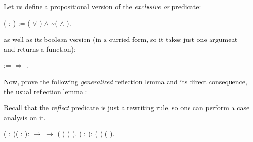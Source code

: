 \begin{exercise}


Let us define a propositional version of the \textit{exclusive or}
 predicate:


\begin{coqdoccode}
\coqdocemptyline
\coqdocnoindent
{}  ( : ) := ( \ensuremath{\lor} ) \ensuremath{\land} \~{}( \ensuremath{\land} ).\coqdoceol
\coqdocemptyline
\end{coqdoccode}


\noindent
as well as its boolean version (in a curried form, so it takes just
one argument and returns a function):


\begin{coqdoccode}
\coqdocemptyline
\coqdocnoindent
{}   :=        \ensuremath{\Rightarrow} .\coqdoceol
\coqdocemptyline
\end{coqdoccode}


\noindent
Now, prove the following \textit{generalized} reflection lemma  and
its direct consequence, the usual reflection lemma :


\hint Recall that the \textit{reflect} predicate is just a rewriting rule,
 so one can perform a case analysis on it.


\begin{coqdoccode}
\coqdocemptyline
\coqdocnoindent
{}  (  : )( : ): \coqdoceol
\coqdocindent{1.00em}
   \ensuremath{\rightarrow}    \ensuremath{\rightarrow}  (  ) (  ).\coqdoceol
\coqdocemptyline
\coqdocnoindent
{}  (  : ):  (  ) (  ).\coqdoceol
\coqdocemptyline
\end{coqdoccode}


\end{exercise}


